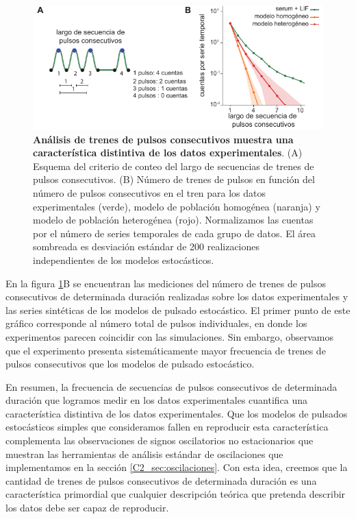 \documentclass[./main.tex]{subfiles}
\begin{document}
 \begin{figure}
    \centering
    \includegraphics[width=1\columnwidth]{figures/chapter2/C2_seq_pulsos_consecutivos.pdf}\caption{\textbf{Análisis de trenes de pulsos consecutivos muestra una característica distintiva de los datos experimentales}. (A) Esquema del criterio de conteo del largo de secuencias de trenes de pulsos consecutivos. (B) Número de trenes de pulsos en función del número de pulsos consecutivos en el tren para los datos experimentales (verde), modelo de población homogénea (naranja) y modelo de población heterogénea (rojo). Normalizamos las cuentas por el número de series temporales de cada grupo de datos. El área sombreada es desviación estándar de 200 realizaciones independientes de los modelos estocásticos.}
    \label{C2_fig:seq_pulsos_consecutivos} %
\end{figure}


En la figura \ref{C2_fig:seq_pulsos_consecutivos}B se encuentran las mediciones del número de trenes de pulsos consecutivos de determinada duración realizadas sobre los datos experimentales y las series sintéticas de los modelos de pulsado estocástico. El primer punto de este gráfico corresponde al número total de pulsos individuales, en donde los experimentos parecen coincidir con las simulaciones. Sin embargo, observamos que el experimento presenta sistemáticamente mayor frecuencia de trenes de pulsos consecutivos que los modelos de pulsado estocástico. 


En resumen, la frecuencia de secuencias de pulsos consecutivos de determinada duración que logramos medir en los datos experimentales cuantifica una característica distintiva de los datos experimentales. Que los modelos de pulsados estocásticos simples que consideramos fallen en reproducir esta característica complementa las observaciones de signos oscilatorios no estacionarios que muestran las herramientas de análisis estándar de oscilaciones que implementamos en la sección \ref{C2_sec:oscilaciones}. Con esta idea, creemos que la cantidad de trenes de pulsos consecutivos de determinada duración es una característica primordial que cualquier descripción teórica que pretenda describir los datos debe ser capaz de reproducir.
\end{document}
